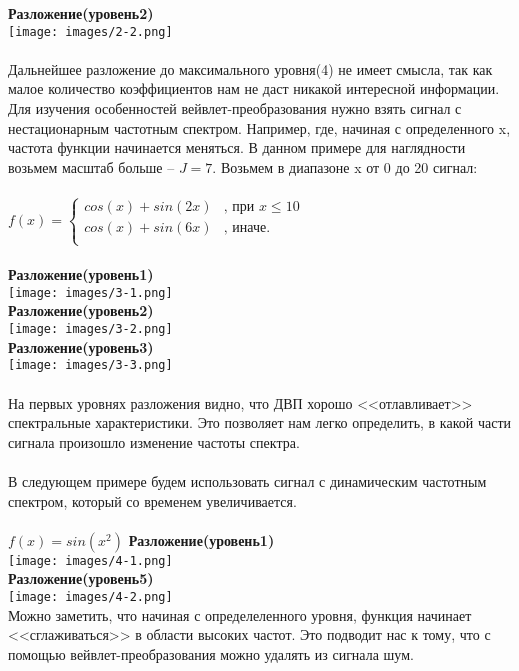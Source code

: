 \documentclass[12pt]{article}
\begin{document}
\textbf{Разложение(уровень2)}\\
\texttt{[image: images/2-2.png]}\\
\\
Дальнейшее разложение до максимального уровня(4) не имеет смысла, так как малое количество коэффициентов нам не даст никакой интересной информации. Для изучения особенностей вейвлет-преобразования нужно взять сигнал с нестационарным частотным спектром. Например, где, начиная с определенного x, частота функции начинается меняться. В данном примере для наглядности возьмем масштаб больше -- $J = 7$. Возьмем в диапазоне x от 0 до 20 сигнал:\\
\\
$
f(x) = 
\begin{cases}
cos(x) + sin(2x) & \text{, при } x \leq 10\\
cos(x) + sin(6x) & \text{, иначе. }\\
\end{cases}
$\\
\\
\textbf{Разложение(уровень1)}\\
\texttt{[image: images/3-1.png]}\\

\textbf{Разложение(уровень2)}\\
\texttt{[image: images/3-2.png]}\\

\textbf{Разложение(уровень3)}\\
\texttt{[image: images/3-3.png]}\\
\\
На первых уровнях разложения видно, что ДВП хорошо <<отлавливает>>  спектральные характеристики.  Это позволяет нам легко определить, в какой части сигнала произошло изменение частоты спектра.\\
\\
В следующем примере будем использовать сигнал с динамическим частотным спектром, который со временем увеличивается.\\
\\
$
f(x) = sin(x^2)
$
\newpage
\textbf{Разложение(уровень1)}\\
\texttt{[image: images/4-1.png]}\\

\textbf{Разложение(уровень5)}\\
\texttt{[image: images/4-2.png]}\\

Можно заметить, что начиная с определеленного уровня, функция начинает <<сглаживаться>> в области высоких частот. Это подводит нас к тому, что с помощью вейвлет-преобразования можно удалять из сигнала шум.
\newpage
\end{document}
